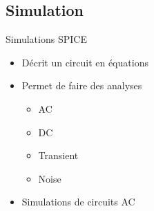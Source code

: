 \subsection{Simulation}

\begin{frame}{Simulations SPICE}
    \begin{twocolumns}
        \leftcol
        \begin{itemize}
            \item Décrit un circuit en équations
            \item Permet de faire des analyses
            \begin{itemize}
                \item AC
                \item DC
                \item Transient
                \item Noise
            \end{itemize}
            \bigskip
            \item Simulations de circuits AC
        \end{itemize}
        \rightcol
    \end{twocolumns}
\end{frame}

